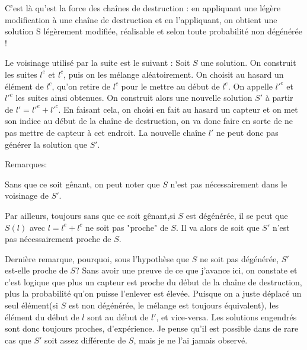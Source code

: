 \documentclass[12pt,a4paper]{article}
\begin{document}
C'est là qu'est la force des chaînes de destruction : en appliquant une légère modification à une chaîne de destruction et en l'appliquant, on obtient une solution S légèrement modifiée, réalisable et selon toute probabilité non dégénérée !  

Le voisinage utilisé par la suite est le suivant :
Soit $S$ une solution. On construit les suites $l^e$ et $l^c$, puis on les mélange aléatoirement. On choisit au hasard un élément de $l^c$, qu'on retire de $l^c$ pour le mettre au début de $l^e$. On appelle $l'^e$ et $l'^c$ les suites ainsi obtenues. On construit alors une nouvelle solution $S'$ à partir de $l'=l'^e+l'^c$.
En faisant cela, on choisi en fait au hasard un capteur et on met son indice au début de la chaîne de destruction, on va donc faire en sorte  de ne pas mettre de capteur à cet endroit. La nouvelle chaîne $l'$ ne peut donc pas générer la solution que $S'$.

Remarques:

Sans que ce soit gênant, on peut noter que $S$ n'est pas nécessairement dans le voisinage de $S'$.

Par ailleurs, toujours sans que ce soit gênant,si $S$ est dégénérée, il se peut que $S(l)$ avec $l=l^e+l^c$ ne soit pas "proche" de $S$. Il va alors de soit que $S'$ n'est pas nécessairement proche de $S$.

Dernière remarque, pourquoi, sous l'hypothèse que $S$ ne soit pas dégénérée, $S'$ est-elle proche de $S$? Sans avoir une preuve de ce que j'avance ici, on constate et c'est logique que plus un capteur est proche du début de la chaîne de destruction, plus la probabilité qu'on puisse l'enlever est élevée. Puisque on a juste déplacé un seul élément(si $S$ est non dégénérée, le mélange est toujours équivalent), les élément du début de $l$ sont au début de $l'$, et vice-versa. Les solutions engendrés sont donc toujours proches, d'expérience. Je pense qu'il est possible dans de rare cas que $S'$ soit assez différente de $S$, mais je ne l'ai jamais observé.
\end{document}
